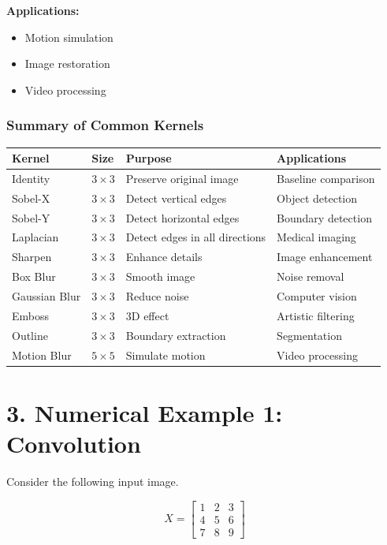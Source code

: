 \documentclass[11pt]{article}
\begin{document}
\textbf{Applications:}
\begin{itemize}
\item Motion simulation
\item Image restoration
\item Video processing
\end{itemize}

\subsubsection*{Summary of Common Kernels}

\begin{center}
\renewcommand{\arraystretch}{1.3}
\begin{tabular}{|p{3cm}|p{2cm}|p{4cm}|p{4cm}|}
\hline
\textbf{Kernel} & \textbf{Size} & \textbf{Purpose} & \textbf{Applications}\\
\hline
Identity & $3\times3$ & Preserve original image & Baseline comparison\\
\hline
Sobel-X & $3\times3$ & Detect vertical edges & Object detection\\
\hline
Sobel-Y & $3\times3$ & Detect horizontal edges & Boundary detection\\
\hline
Laplacian & $3\times3$ & Detect edges in all directions & Medical imaging\\
\hline
Sharpen & $3\times3$ & Enhance details & Image enhancement\\
\hline
Box Blur & $3\times3$ & Smooth image & Noise removal\\
\hline
Gaussian Blur & $3\times3$ & Reduce noise & Computer vision\\
\hline
Emboss & $3\times3$ & 3D effect & Artistic filtering\\
\hline
Outline & $3\times3$ & Boundary extraction & Segmentation\\
\hline
Motion Blur & $5\times5$ & Simulate motion & Video processing\\
\hline
\end{tabular}
\end{center}
\section*{3. Numerical Example 1: Convolution}

Consider the following input image.

\[
X=
\begin{bmatrix}
1&2&3\\
4&5&6\\
7&8&9
\end{bmatrix}
\]
\end{document}
